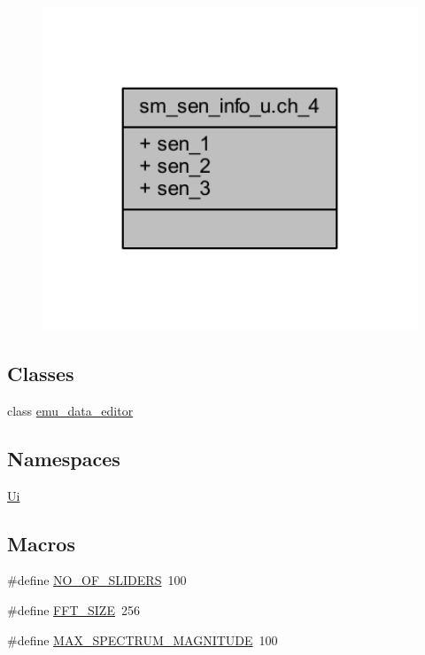 \begin{figure}[H]
\begin{center}
\leavevmode
\includegraphics[width=350pt]{d4/d04/a00255}
\end{center}
\end{figure}
\subsection*{Classes}
\begin{DoxyCompactItemize}
\item 
class \hyperlink{a00008}{emu\+\_\+data\+\_\+editor}
\end{DoxyCompactItemize}
\subsection*{Namespaces}
\begin{DoxyCompactItemize}
\item 
 \hyperlink{a00145}{Ui}
\end{DoxyCompactItemize}
\subsection*{Macros}
\begin{DoxyCompactItemize}
\item 
\#define \hyperlink{a00094_a958de936b60eb9d784cdb10be7d39373}{N\+O\+\_\+\+O\+F\+\_\+\+S\+L\+I\+D\+E\+R\+S}~100
\item 
\#define \hyperlink{a00094_a636ddc19af00bc87969a07c88331f105}{F\+F\+T\+\_\+\+S\+I\+Z\+E}~256
\item 
\#define \hyperlink{a00094_a60ece807960441ee99b05b2e536cad76}{M\+A\+X\+\_\+\+S\+P\+E\+C\+T\+R\+U\+M\+\_\+\+M\+A\+G\+N\+I\+T\+U\+D\+E}~100
\end{DoxyCompactItemize}


